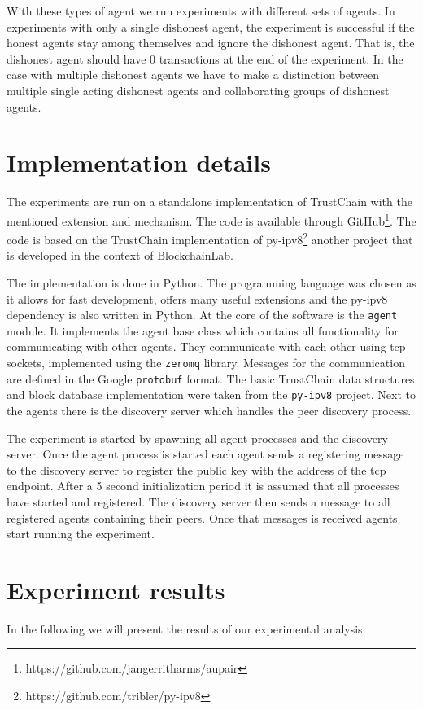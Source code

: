 With these types of agent we run experiments with different sets of agents. In experiments with only
a single dishonest agent, the experiment is successful if the honest agents stay among themselves
and ignore the dishonest agent. That is, the dishonest agent should have 0 transactions at the end
of the experiment. In the case with multiple dishonest agents we have to make a distinction between
multiple single acting dishonest agents and collaborating groups of dishonest agents. 

\section{Implementation details}

The experiments are run on a standalone implementation of TrustChain with the mentioned extension
and mechanism. The code is available through GitHub\footnote{https://github.com/jangerritharms/aupair}.
The code is based on the TrustChain implementation of py-ipv8\footnote{https://github.com/tribler/py-ipv8}
another project that is developed in the context of BlockchainLab. 

The implementation is done in Python. The programming language was chosen as it allows for fast development,
offers many useful extensions and the py-ipv8 dependency is also written in Python. At the core of
the software is the \texttt{agent} module. It implements the agent base class which contains all 
functionality for communicating with other agents. They communicate with each other using tcp sockets, 
implemented using the \texttt{zeromq} library. Messages for the communication are defined in the 
Google \texttt{protobuf} format. The basic TrustChain data structures and block database implementation
were taken from the \texttt{py-ipv8} project. Next to the agents there is the discovery 
server which handles the peer discovery process. 

The experiment is started by spawning all agent processes and the discovery server. Once the agent 
process is started each agent sends a registering message to the discovery server to register the 
public key with the address of the tcp endpoint. After a 5 second initialization period it is assumed
that all processes have started and registered. The discovery server then sends a message to all 
registered agents containing their peers. Once that messages is received agents start running the
experiment. 

\section{Experiment results}
In the following we will present the results of our experimental analysis.
